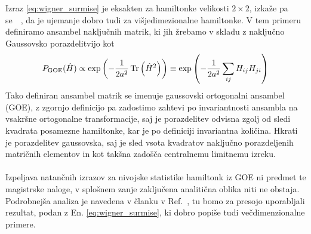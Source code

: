  Izraz \eqref{eq:wigner_surmise} je eksakten za hamiltonke velikosti $2\times2$, izkaže pa se~\cite{abanin2018ergodicity}~\cite{atas2013distribution}, da je ujemanje dobro tudi za višjedimezionalne hamiltonke. V tem primeru definiramo ansambel naključnih matrik, ki jih žrebamo v skladu z naključno Gaussovsko porazdelitvijo kot
 \begin{equation}
 P_\mathrm{GOE}(\hat{H})\propto \exp\left(-\frac{1}{2a^2}\mathop{\rm Tr}\left(\hat{H}^2\right) \right) \equiv \exp\left(-\frac{1}{2a^2}\sum\limits_{ij}H_{ij}H_{ji} \right)
 \end{equation}
 Tako definiran ansambel matrik se imenuje gaussovski ortogonalni ansambel (GOE), z zgornjo definicijo pa zadostimo zahtevi po invariantnosti ansambla na vsakršne ortogonalne transformacije, saj je porazdelitev odvisna zgolj od sledi kvadrata posamezne hamiltonke, kar je po definiciji invariantna količina. Hkrati je porazdelitev gaussovska, saj je sled vsota kvadratov naključno porazdeljenih matričnih elementov in kot takšna zadošča centralnemu limitnemu izreku. \\\\Izpeljava natančnih izrazov za nivojske statistike hamiltonk iz GOE ni predmet te magistrske naloge, v splošnem zanje zaključena analitična oblika niti ne obstaja. Podrobnejša analiza je navedena v članku v Ref.~\cite{atas2013distribution}, tu bomo za presojo uporabljali rezultat, podan z En. \eqref{eq:wigner_surmise}, ki dobro popiše tudi večdimenzionalne primere. 
